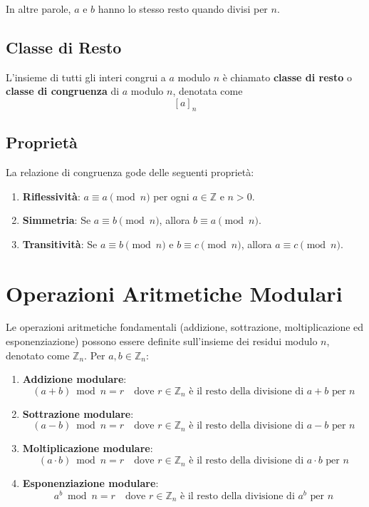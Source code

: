 \documentclass[a4paper,12pt]{report}
\begin{document}
In altre parole, $a$ e $b$ hanno lo stesso resto quando divisi per $n$. 

\subsection*{Classe di Resto}
L'insieme di tutti gli interi congrui a $a$ modulo $n$ è chiamato \textbf{classe di resto} o \textbf{classe di congruenza} di $a$ modulo $n$, denotata come \[[a]_n\]

\subsection*{Proprietà}
La relazione di congruenza gode delle seguenti proprietà:

\begin{enumerate}
    \item \textbf{Riflessività}: $a \equiv a \pmod{n}$ per ogni $a \in \mathbb{Z}$ e $n > 0$.
    \item \textbf{Simmetria}: Se $a \equiv b \pmod{n}$, allora $b \equiv a \pmod{n}$.
    \item \textbf{Transitività}: Se $a \equiv b \pmod{n}$ e $b \equiv c \pmod{n}$, allora $a \equiv c \pmod{n}$.
\end{enumerate}

\section{Operazioni Aritmetiche Modulari}
Le operazioni aritmetiche fondamentali (addizione, sottrazione, moltiplicazione ed esponenziazione) possono essere definite sull'insieme dei residui modulo $n$, denotato come $\mathbb{Z}_n$. Per $a, b \in \mathbb{Z}_n$:

\begin{enumerate}
    \item \textbf{Addizione modulare}:
    $$(a + b) \bmod n = r \quad \text{dove } r \in \mathbb{Z}_n \text{ è il resto della divisione di } a+b \text{ per } n$$
    
    \item \textbf{Sottrazione modulare}:
    $$(a - b) \bmod n = r \quad \text{dove } r \in \mathbb{Z}_n \text{ è il resto della divisione di } a-b \text{ per } n$$
    
    \item \textbf{Moltiplicazione modulare}:
    $$(a \cdot b) \bmod n = r \quad \text{dove } r \in \mathbb{Z}_n \text{ è il resto della divisione di } a \cdot b \text{ per } n$$
    
    \item \textbf{Esponenziazione modulare}:
    $$a^b \bmod n = r \quad \text{dove } r \in \mathbb{Z}_n \text{ è il resto della divisione di } a^b \text{ per } n$$
\end{enumerate}
\end{document}
